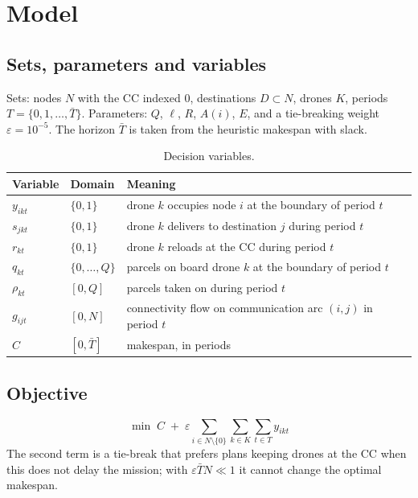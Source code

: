 \documentclass[11pt]{article}
\begin{document}
\section{Model}

\subsection{Sets, parameters and variables}

Sets: nodes $N$ with the CC indexed $0$, destinations $D \subset N$, drones $K$,
periods $T = \{0,1,\dots,\bar{T}\}$. Parameters: $Q$, $\ell$, $R$, $A(i)$, $E$, and a
tie-breaking weight $\varepsilon = 10^{-5}$. The horizon $\bar{T}$ is taken from the
heuristic makespan with slack.

\begin{table}[h]
\centering
\caption{Decision variables.}
\begin{tabular}{lll}
\toprule
Variable & Domain & Meaning \\
\midrule
$y_{ikt}$ & $\{0,1\}$ & drone $k$ occupies node $i$ at the boundary of period $t$ \\
$s_{jkt}$ & $\{0,1\}$ & drone $k$ delivers to destination $j$ during period $t$ \\
$r_{kt}$ & $\{0,1\}$ & drone $k$ reloads at the CC during period $t$ \\
$q_{kt}$ & $\{0,\dots,Q\}$ & parcels on board drone $k$ at the boundary of period $t$ \\
$\rho_{kt}$ & $[0,Q]$ & parcels taken on during period $t$ \\
$g_{ijt}$ & $[0,N]$ & connectivity flow on communication arc $(i,j)$ in period $t$ \\
$C$ & $[0,\bar{T}]$ & makespan, in periods \\
\bottomrule
\end{tabular}
\end{table}

\subsection{Objective}

\begin{equation}
\min \; C \;+\; \varepsilon \sum_{i \in N \setminus \{0\}} \sum_{k \in K} \sum_{t \in T} y_{ikt}
\label{eq:obj}
\end{equation}
The second term is a tie-break that prefers plans keeping drones at the CC when this does not
delay the mission; with $\varepsilon \bar{T} N \ll 1$ it cannot change the optimal makespan.
\end{document}
